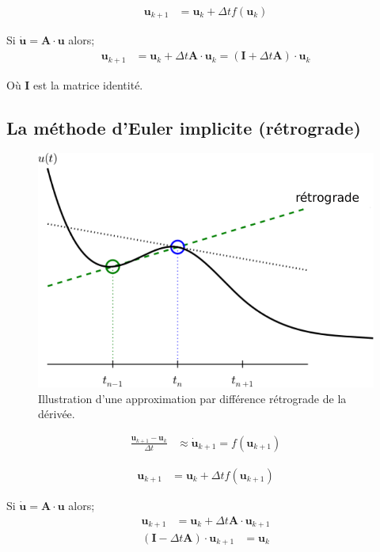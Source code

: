 \documentclass[%
oneside,                 %
final,                   %
10pt]{article}
\begin{document}
\begin{align}
\pmb{u}_{k+1}  &= \pmb{u}_k + \Delta t  f(\pmb{u}_k)
\end{align}

Si $\pmb{\dot{u}} = \pmb{A} \cdot \pmb{u}$ alors;
\begin{align}
\label{eq:euler_exp}
\pmb{u}_{k+1}  &= \pmb{u}_k + \Delta t \pmb{A} \cdot \pmb{u}_k = (\pmb{I} + \Delta t  \pmb{A}) \cdot \pmb{u}_k
\end{align}

Où $\pmb{I}$ est la matrice identité.

\subsection{La méthode d'Euler implicite (rétrograde)}


\begin{figure}[!ht]  %
  \centerline{\includegraphics[width=0.7\linewidth]{imgs/fd_backward.pdf}}
  \caption{
  Illustration d'une approximation par différence rétrograde de la dérivée.
  }
\end{figure}


\begin{align}
\frac{\pmb{u}_{k+1}-\pmb{u}_k}{\Delta t} &\approx \pmb{\dot{u}}_{k+1} = f(\pmb{u}_{k+1})
\end{align}

\begin{align}
\pmb{u}_{k+1}  &= \pmb{u}_k + \Delta t  f(\pmb{u}_{k+1})
\end{align}

Si $\pmb{\dot{u}} = \pmb{A} \cdot \pmb{u}$ alors;
\begin{align}
\pmb{u}_{k+1}  &= \pmb{u}_k + \Delta t \pmb{A} \cdot \pmb{u}_{k+1}
\end{align}
\begin{align}
(\pmb{I} - \Delta t  \pmb{A}) \cdot \pmb{u}_{k+1}  &= \pmb{u}_k
\end{align}
\end{document}
